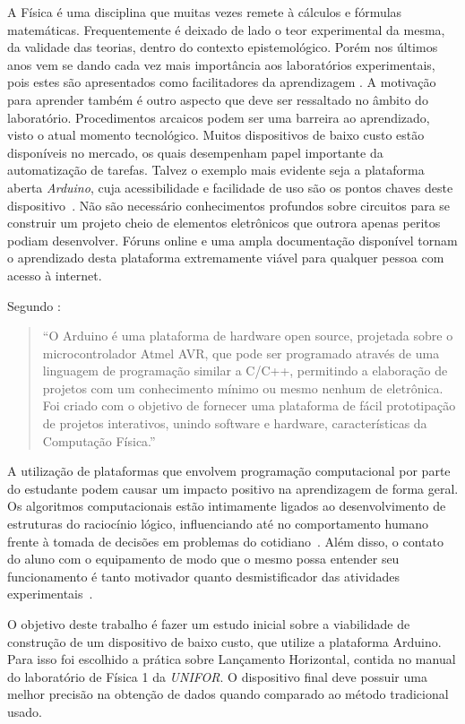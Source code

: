 \documentclass[11pt,a4paper]{article}
\begin{document}
A Física é uma disciplina que muitas vezes remete à cálculos e fórmulas matemáticas.
Frequentemente é deixado de lado o teor experimental da mesma, da validade das teorias, dentro do contexto epistemológico.
Porém nos últimos anos vem se dando cada vez mais importância aos laboratórios experimentais, pois estes são apresentados como facilitadores da aprendizagem
\cite{Grandini_2004, Marineli_2006, Souza_2011, RodriguesCunha2014}.
A motivação para aprender também é outro aspecto que deve ser ressaltado no âmbito do laboratório.
Procedimentos arcaicos podem ser uma barreira ao aprendizado, visto o atual momento tecnológico.
Muitos dispositivos de baixo custo estão disponíveis no mercado, os quais desempenham papel importante da automatização de tarefas.
Talvez o exemplo mais evidente seja a plataforma aberta \emph{Arduino}, cuja acessibilidade e facilidade de uso são os pontos chaves deste dispositivo~\cite{OliveiraZanetti2015}.
Não são necessário conhecimentos profundos sobre circuitos para se construir um projeto cheio de elementos eletrônicos que outrora apenas peritos podiam desenvolver.
Fóruns online e uma ampla documentação disponível tornam o aprendizado desta plataforma extremamente viável para qualquer pessoa com acesso à internet.


Segundo \textcite{OliveiraZanetti2015}:
\begin{quote}
``O Arduino é uma plataforma de hardware open source, projetada sobre o microcontrolador Atmel AVR, que pode ser programado através de uma linguagem de programação similar a C/C++, permitindo a elaboração de projetos com um conhecimento mínimo ou mesmo nenhum de eletrônica.
Foi criado com o objetivo de fornecer uma plataforma de fácil prototipação de projetos interativos, unindo software e hardware, características da Computação Física.''
\end{quote}


A utilização de plataformas que envolvem programação computacional por parte do estudante podem causar um impacto positivo na aprendizagem de forma geral.
Os algoritmos computacionais estão intimamente ligados ao desenvolvimento de estruturas do raciocínio lógico, influenciando até no comportamento humano frente à tomada de decisões em problemas do cotidiano~\cite{Wing_2008, Zanetti_2015}.
Além disso, o contato do aluno com o equipamento de modo que o mesmo possa entender seu funcionamento é tanto motivador quanto desmistificador das atividades experimentais~\cite{Rosa2003}.

O objetivo deste trabalho é fazer um estudo inicial sobre a viabilidade de construção de um dispositivo de baixo custo, que utilize a plataforma Arduino.
Para isso foi escolhido a prática sobre Lançamento Horizontal, contida no manual do laboratório de Física 1 da \emph{UNIFOR}.
O dispositivo final deve possuir uma melhor precisão na obtenção de dados quando comparado ao método tradicional usado.
\end{document}
